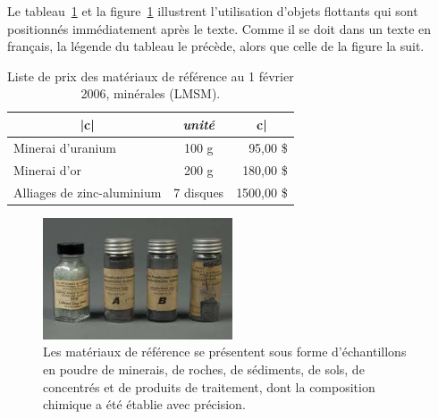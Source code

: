 \documentclass[french]{article}
\newcommand\multi[2]{\multicolumn{1}{#1}{#1}}
\begin{document}
	Le tableau~\ref{t:prix_materiaux} et la figure~\ref{f:echantillons} illustrent l'utilisation 
	d'objets flottants qui sont positionnés immédiatement après le texte. Comme il se doit dans 
	un texte en français, la légende du tableau le précède, alors que celle de la figure la suit.
	\begin{table}[htp]	 \caption{Liste de prix des matériaux de référence au 1 février 2006, minérales (LMSM).}
		\centering
		\label{t:prix_materiaux}
		\begin{tabular}{|l|c|r|} \hline\hline
			\multi{|c|}{\emph{description}} & \emph{unité} & \multi{c|}{\emph{prix}}
			\\ \hline
			Minerai d'uranium          & 100 g     &   95,00  \$ \\
			Minerai d'or               & 200 g     &  180,00  \$ \\
			Alliages de zinc-aluminium & 7 disques & 1500,00 \$ \\
			\hline\hline
		\end{tabular}
	\end{table}
	\begin{figure} %
		\centering
		\includegraphics[width=0.5\textwidth]{mat}
		\caption{Les matériaux de référence se présentent sous forme d'échantillons en
			poudre de minerais, de roches, de sédiments, de sols, de concentrés et de
			produits de traitement, dont la composition chimique a été établie avec
			précision.} 		\label{f:echantillons}
	\end{figure}
\end{document}
